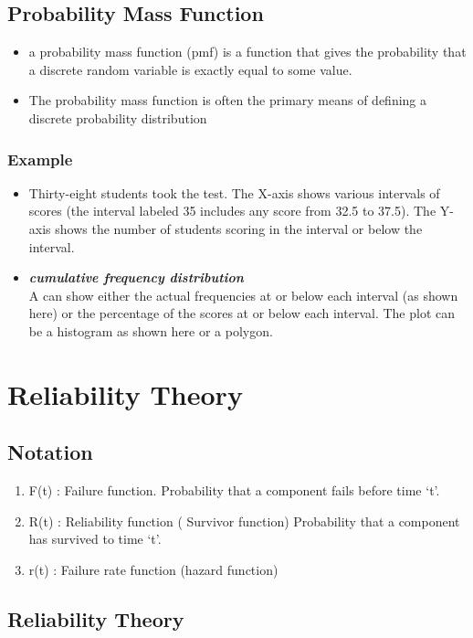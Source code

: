 \section{Probability Mass Function}
\begin{itemize} \item a probability mass function (pmf) is a function that gives the probability that a discrete random variable is exactly equal to some value. \item The probability mass function is often the primary means of defining a discrete probability distribution \end{itemize}
\subsection{Example}
\begin{itemize}
	\item Thirty-eight students took the test. The X-axis shows various intervals of scores (the interval labeled 35 includes any score from 32.5 to 37.5). The Y-axis shows the number of students scoring in the interval or below the interval.
	
	\item \textbf{\emph{cumulative frequency distribution}} \\A  can show either the actual frequencies at or below each interval (as shown here) or the percentage of the scores at or below each interval. The plot can be a histogram as shown here or a polygon.
\end{itemize}
\chapter{Reliability Theory}

\section{Notation}\begin{enumerate}
	\item
	F(t) : Failure function. Probability that a component fails
	before time `t'.
	\item R(t) : Reliability function ( Survivor function) Probability that a component
	has survived to time `t'.
	\item r(t) : Failure rate function (hazard function)
\end{enumerate}

\section{Reliability Theory}

